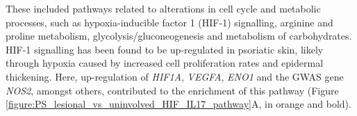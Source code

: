 These included pathways related to alterations in cell cycle and metabolic processes, such as hypoxia-inducible factor 1 (HIF-1) signalling, arginine and proline metabolism, glycolysis/gluconeogenesis and metabolism of carbohydrates. %
HIF-1 signalling has been found to be up-regulated in psoriatic skin, likely through hypoxia caused by increased cell proliferation rates and epidermal thickening. Here, up-regulation of \textit{HIF1A}, \textit{VEGFA}, \textit{ENO1} and the GWAS gene \textit{NOS2}, amongst others, contributed to the enrichment of this pathway (Figure \ref{figure:PS_lesional_vs_uninvolved_HIF_IL17_pathway}A, in orange and bold). 




